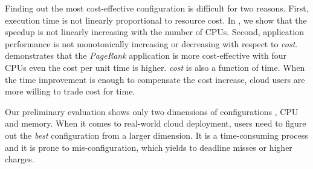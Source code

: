 Finding out the most cost-effective configuration
is difficult for two reasons.
First, execution time is not linearly proportional to resource cost.
In \myfigure{\ref{fig:speed_1gb}}, we show that
the speedup is not linearly increasing with the number of CPUs.
Second, 
application performance is not monotonically increasing or decreasing
with respect to \emph{cost}.
\myfigure{\ref{fig:pagerank_cost}} demonstrates that
the \emph{PageRank} application is more cost-effective with four CPUs
even the cost per unit time is higher.
\emph{cost} is also a function of time.
When the time improvement is enough to compensate the cost increase,
cloud users are more willing to trade cost for time.

Our preliminary evaluation shows only two dimensions of configurations
, CPU and memory.
When it comes to real-world cloud deployment,
users need to figure out the \emph{best} configuration from
a larger dimension.
It is a time-consuming process and it is prone to mis-configuration,
which yields to deadline misses or higher charges.









